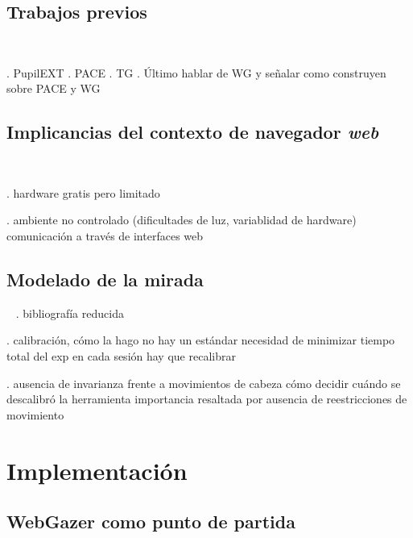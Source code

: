 \documentclass{beamer}
\begin{document}
\subsection{Trabajos previos}

\begin{frame}{~}

. PupilEXT
. PACE
. TG
. Último hablar de WG y señalar como construyen sobre PACE y WG

\end{frame}

\subsection{Implicancias del contexto de navegador \textit{web}}

\begin{frame}{~}

. hardware gratis pero limitado

. ambiente no controlado (dificultades de luz, variablidad de hardware)
  comunicación a través de interfaces web

\end{frame}

\subsection{Modelado de la mirada}

\begin{frame}{~}
. bibliografía reducida

. calibración, cómo la hago
  no hay un estándar
  necesidad de minimizar tiempo total del exp
  en cada sesión hay que recalibrar

. ausencia de invarianza frente a movimientos de cabeza
  cómo decidir cuándo se descalibró la herramienta
  importancia resaltada por ausencia de reestricciones de movimiento
\end{frame}

\section{Implementación}

\subsection{WebGazer como punto de partida}
\end{document}
